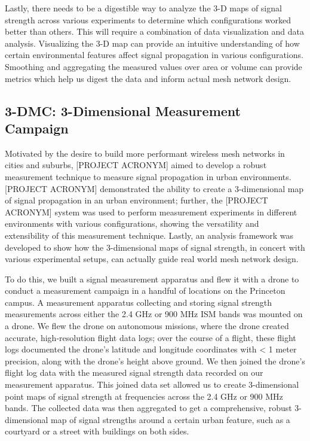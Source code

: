\documentclass[pageno]{jpaper}
\begin{document}
Lastly, there needs to be a digestible way to analyze the 3-D maps of signal strength across various experiments to determine which configurations worked better than others. This will require a combination of data visualization and data analysis. Visualizing the 3-D map can provide an intuitive understanding of how certain environmental features affect signal propagation in various configurations. Smoothing and aggregating the measured values over area or volume can provide metrics which help us digest the data and inform actual mesh network design.

\subsection{3-DMC: 3-Dimensional Measurement Campaign}

Motivated by the desire to build more performant wireless mesh networks  in cities and suburbs, [PROJECT ACRONYM] aimed to develop a robust measurement technique to measure signal propagation in urban environments. [PROJECT ACRONYM] demonstrated the ability to create a 3-dimensional map of signal propagation in an urban environment; further, the [PROJECT ACRONYM] system was used to perform measurement experiments in different environments with various configurations, showing the versatility and extensibility of this measurement technique. Lastly, an analysis framework was developed to show how the 3-dimensional maps of signal strength, in concert with various experimental setups, can actually guide real world mesh network design. 

To do this, we built a signal measurement apparatus and flew it with a drone to conduct a measurement campaign in a handful of locations on the Princeton campus. A measurement apparatus collecting and storing signal strength measurements across either the 2.4 GHz or 900 MHz ISM bands was  mounted on a drone. We flew the drone on autonomous missions, where the drone created accurate, high-resolution flight data logs; over the course of a flight, these flight logs documented the drone's latitude and longitude coordinates with < 1 meter precision, along with the drone's height above ground. We then joined the drone's flight log data with the measured signal strength data recorded on our measurement apparatus. This joined data set allowed us to create 3-dimensional point maps of signal strength at frequencies across the 2.4 GHz or 900 MHz bands. The collected data was then aggregated to get a comprehensive, robust 3-dimensional map of signal strengths around a certain urban feature, such as a courtyard or a street with buildings on both sides.
\end{document}
